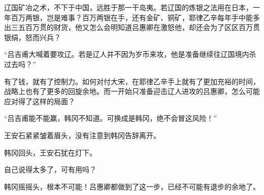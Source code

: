 辽国矿冶之术，不下于中国，远胜于那一干岛夷。若辽国的炼银之法用在日本，一年百万两银，岂是难事？百万两银在手，还有金矿、铜矿，耶律乙辛每年手中能多出三五百万贯的财货，他又怎么会明知道吕惠卿在激怒他，却还会为了区区百万贯银绢，怒而兴兵？

“吕吉甫大喊着要攻辽。若是辽人并不因为岁币来攻，他是准备继续往辽国境内杀过去吗？”

有了钱，就有了控制力。如何对付大宋，在耶律乙辛手上就有了更加充裕的时间，战略上也有了更多的回旋余地。而一开始只准备迎击辽人进攻的吕惠卿，怎么可能应对得了这样的局面？

“吕吉甫能不能赢，韩冈不知道。可换成是韩冈，绝不会冒这风险！”

王安石紧紧皱着眉头，没有注意到韩冈告辞离开。

韩冈回头，王安石犹在灯下。

自己说得太多了，可有用吗？

韩冈摇摇头，根本不可能！吕惠卿都做到了这一步，已经不可能有退步的余地了。
